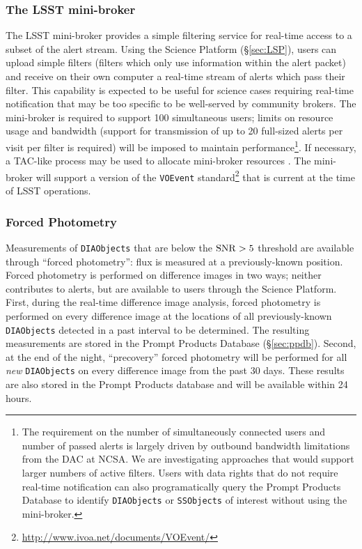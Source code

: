 \subsubsection{The LSST mini-broker}\label{sec:mini-broker}

The LSST mini-broker provides a simple filtering service for real-time access to a subset of the alert stream.
Using the Science Platform (\S \ref{sec:LSP}),
users can upload simple filters (filters which only use information within the alert packet) and receive on their own computer a real-time stream of alerts which pass their filter.
This capability is expected to be useful for science cases requiring real-time notification that may be too specific to be well-served by community brokers.
The mini-broker is required to support 100 simultaneous users; limits on resource usage and bandwidth (support for transmission of up to 20 full-sized alerts per visit per filter is required) will be imposed to maintain performance\footnote{
The requirement on the number of simultaneously connected users and number of passed alerts is largely driven by outbound bandwidth limitations from the DAC at NCSA. 
We are investigating approaches that would support larger numbers of active filters.
Users with data rights that do not require real-time notification can also programatically query the Prompt Products Database to identify \texttt{DIAObjects} or \texttt{SSObjects} of interest without using the mini-broker.}.
If necessary, a TAC-like process may be used to allocate mini-broker resources .
The mini-broker will support a version of the \texttt{VOEvent} standard\footnote{\url{http://www.ivoa.net/documents/VOEvent/}} that is current at the time of LSST operations.

\subsubsection{Forced Photometry}\label{sec:AGP_force}

Measurements of \texttt{DIAObjects} that are below the ${\rm SNR} > 5$ threshold are available through ``forced photometry'': flux is measured at a previously-known position.
Forced photometry is performed on difference images in two ways; neither contributes to alerts, but are available to users through the Science Platform.
First, during the real-time difference image analysis, forced photometry is performed on every difference image at the locations of all previously-known {\tt DIAObjects} detected in a past interval to be determined.
The resulting measurements are stored in the Prompt Products Database (\S \ref{sec:ppdb}).
Second, at the end of the night, ``precovery'' forced photometry will be performed for all \textit{new} \texttt{DIAObjects} on every difference image from the past 30 days.
These results are also stored in the Prompt Products database and will be available within 24 hours.
 
